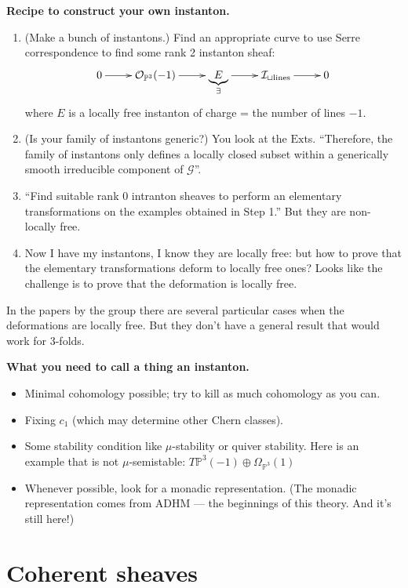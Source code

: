 \medskip\noindent
{\bf Recipe to construct your own instanton.}
\begin{enumerate}
\item (Make a bunch of instantons.) Find an appropriate curve to 
use Serre correspondence to find some rank 2 instanton sheaf:
$$
\xymatrix{
0\ar[r]&\mathcal{O}_{\mathbb{P}^3}(-1)\ar[r]&\underbrace{E}_{\exists
}\ar[r]&\mathcal{I}_{\sqcup \text{lines}}\ar[r]&0
}
$$
where $E$ is a locally free instanton of charge = the number of lines $-1$.

\item (Is your family of instantons generic?) You look at the $\text{Ext}$s.
``Therefore, the family of instantons only defines a locally closed subset
within a generically smooth irreducible component of $\mathcal{G}$''.

\item ``Find suitable rank 0 intranton sheaves to perform an elementary
transformations on the examples obtained in Step 1.'' But they are non-locally
free.

\item Now I have my instantons, I know they are locally free: but how to prove
that the elementary transformations deform to locally free ones? Looks like
the challenge is to prove that the deformation is locally free.
\end{enumerate}

In the papers by the group there are several particular cases when the
deformations are locally free. But they don't have a general result that would
work for 3-folds.

\medskip\noindent
{\bf What you need to call a thing an instanton.}
\begin{itemize}
\item Minimal cohomology possible; try to kill as much cohomology as you can.
\item Fixing $c_1$ (which may determine other Chern classes).
\item Some stability condition like $\mu$-stability or quiver stability. Here is
an example that is not $\mu$-semistable: 
$T\mathbb{P}^3(-1)\oplus\Omega_{\mathbb{P}^3}(1)$
\item Whenever possible, look for a monadic representation. (The monadic
representation comes from ADHM --- the beginnings of this theory. And it's still
here!)
\end{itemize}

\section{Coherent sheaves}
\label{section-coherent-sheaves}

